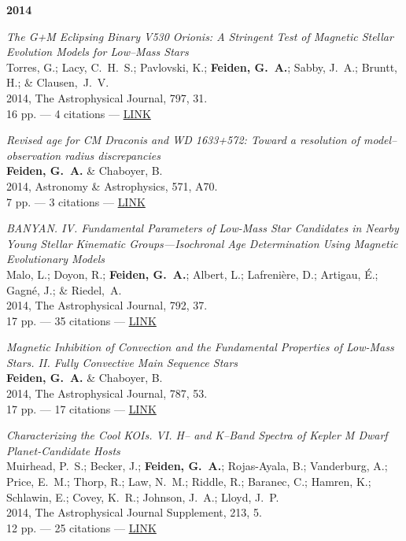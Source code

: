 \documentclass[11pt,a4paper]{article}
\begin{document}
\begin{etaremune}[leftmargin=0.4in]
	\item[{\bf 2014}]

	\item {\it The G+M Eclipsing Binary V530 Orionis: A Stringent Test of Magnetic Stellar Evolution Models for Low--Mass Stars} \\
		Torres, G.; Lacy, C.~H.~S.; Pavlovski, K.; {\bf Feiden, G.~A.}; Sabby, J.~A.; Bruntt, H.; \& Clausen,~J.~V.	\\
 		2014, The Astrophysical Journal, 797, 31. \\
		16 pp. --- 4 citations --- \href{http://adsabs.harvard.edu/abs/2014ApJ...797...31T}{LINK}

	\item {\it Revised age for CM Draconis and WD 1633+572: Toward a resolution of model--observation radius discrepancies} \\
        {\bf Feiden, G.~A.} \& Chaboyer, B. \\
        2014, Astronomy \& Astrophysics, 571, A70. \\
        7 pp. --- 3 citations --- \href{http://adsabs.harvard.edu/abs/2014arXiv1405.7051F}{LINK}
    
	\item {\it BANYAN. IV. Fundamental Parameters of Low-Mass Star Candidates in Nearby Young Stellar Kinematic Groups---Isochronal Age Determination Using Magnetic Evolutionary Models} \\
      Malo, L.; Doyon, R.; {\bf Feiden, G.~A.}; Albert, L.; Lafreni\`{e}re, D.; Artigau, \'{E}.; Gagn\'{e}, J.; \& Riedel,~A. \\
      2014, The Astrophysical Journal, 792, 37. \\
      17 pp. --- 35 citations --- \href{http://adsabs.harvard.edu/abs/2014ApJ...792...37M}{LINK}
         
    \item  {\it Magnetic Inhibition of Convection and the Fundamental Properties of Low-Mass Stars. II. Fully Convective Main Sequence Stars} \\
       {\bf Feiden, G.~A.} \& Chaboyer, B. \\
       2014, The Astrophysical Journal, 787, 53. \\
       17 pp. --- 17 citations --- \href{http://adsabs.harvard.edu/abs/2014ApJ...789...53F}{LINK}
    
    \item {\it Characterizing the Cool KOIs. VI. H-- and K--Band Spectra of Kepler M Dwarf Planet-Candidate Hosts} \\
       Muirhead, P.~S.; Becker, J.; {\bf Feiden, G.~A.}; Rojas-Ayala, B.; Vanderburg, A.; Price, E.~M.; Thorp, R.; Law, N.~M.; Riddle, R.; Baranec, C.; Hamren, K.; Schlawin, E.; Covey, K.~R.; Johnson, J.~A.; Lloyd, J.~P. \\
       2014, The Astrophysical Journal Supplement, 213, 5. \\ 
       12 pp. --- 25 citations --- \href{http://adsabs.harvard.edu/abs/2014ApJS..213....5M}{LINK}


\end{etaremune}
\end{document}
